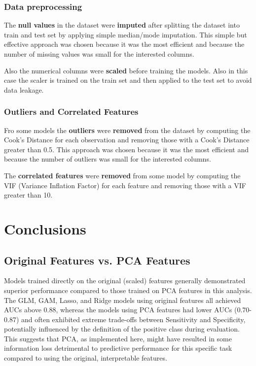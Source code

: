 \subsection{Data preprocessing}
The \textbf{null values} in the dataset were \textbf{imputed} after splitting the dataset into train and test set by applying simple median/mode imputation. This simple but effective approach was chosen because it was the most efficient and because the number of missing values was small for the interested columns.

Also the numerical columns were \textbf{scaled} before training the models. Also in this case the scaler is trained on the train set and then applied to the test set to avoid data leakage.

\subsection{Outliers and Correlated Features}
Fro some models the \textbf{outliers} were \textbf{removed} from the dataset by computing the Cook's Distance for each observation and removing those with a Cook's Distance greater than 0.5. This approach was chosen because it was the most efficient and because the number of outliers was small for the interested columns.

The \textbf{correlated features} were \textbf{removed} from some model by computing the VIF (Variance Inflation Factor) for each feature and removing those with a VIF greater than 10.

\chapter{Conclusions}
\section{Original Features vs. PCA Features}
Models trained directly on the original (scaled) features generally demonstrated superior performance compared to those trained on PCA features in this analysis. The GLM, GAM, Lasso, and Ridge models using original features all achieved AUCs above 0.88, whereas the models using PCA features had lower AUCs (0.70-0.87) and often exhibited extreme trade-offs between Sensitivity and Specificity, potentially influenced by the definition of the positive class during evaluation. This suggests that PCA, as implemented here, might have resulted in some information loss detrimental to predictive performance for this specific task compared to using the original, interpretable features.

